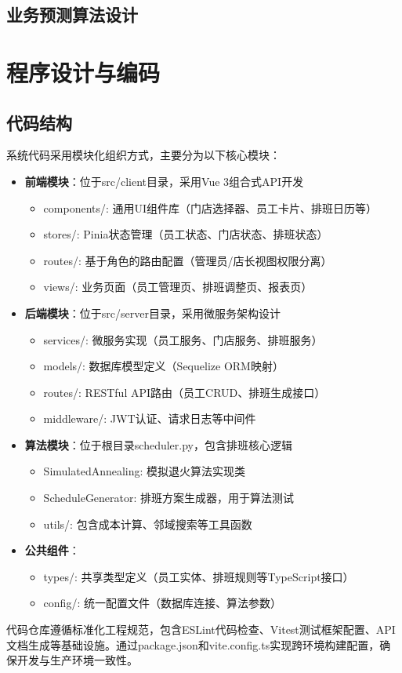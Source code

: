 \documentclass{ctexart}
\begin{document}
\subsection{业务预测算法设计}

\section{程序设计与编码}
\subsection{代码结构}
系统代码采用模块化组织方式，主要分为以下核心模块：
\begin{itemize}
    \item \textbf{前端模块}：位于src/client目录，采用Vue 3组合式API开发
    \begin{itemize}
        \item components/: 通用UI组件库（门店选择器、员工卡片、排班日历等）
        \item stores/: Pinia状态管理（员工状态、门店状态、排班状态）
        \item routes/: 基于角色的路由配置（管理员/店长视图权限分离）
        \item views/: 业务页面（员工管理页、排班调整页、报表页）
    \end{itemize}

    \item \textbf{后端模块}：位于src/server目录，采用微服务架构设计
    \begin{itemize}
        \item services/: 微服务实现（员工服务、门店服务、排班服务）
        \item models/: 数据库模型定义（Sequelize ORM映射）
        \item routes/: RESTful API路由（员工CRUD、排班生成接口）
        \item middleware/: JWT认证、请求日志等中间件
    \end{itemize}

    \item \textbf{算法模块}：位于根目录scheduler.py，包含排班核心逻辑
    \begin{itemize}
        \item SimulatedAnnealing: 模拟退火算法实现类
        \item ScheduleGenerator: 排班方案生成器，用于算法测试
        \item utils/: 包含成本计算、邻域搜索等工具函数
    \end{itemize}

    \item \textbf{公共组件}：
    \begin{itemize}
        \item types/: 共享类型定义（员工实体、排班规则等TypeScript接口）
        \item config/: 统一配置文件（数据库连接、算法参数）
    \end{itemize}
\end{itemize}
代码仓库遵循标准化工程规范，包含ESLint代码检查、Vitest测试框架配置、API文档生成等基础设施。通过package.json和vite.config.ts实现跨环境构建配置，确保开发与生产环境一致性。
\end{document}
